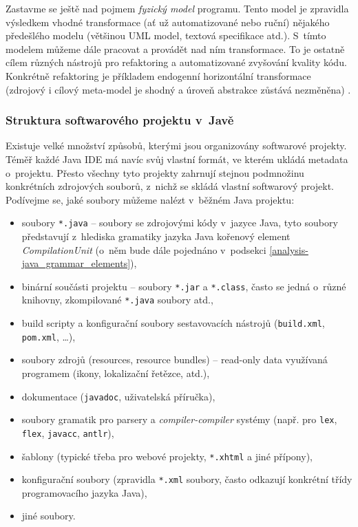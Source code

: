 Zastavme se ještě nad pojmem \emph{fyzický model} programu. Tento model je zpravidla výsledkem vhodné transformace (ať už automatizované nebo ruční) nějakého předešlého modelu (většinou UML model, textová specifikace atd.). S~tímto modelem můžeme dále pracovat a provádět nad ním transformace. To je ostatně cílem různých nástrojů pro refaktoring a automatizované zvyšování kvality kódu. Konkrétně refaktoring je příkladem endogenní horizontální transformace (zdrojový i cílový meta-model je shodný a úroveň abstrakce zůstává nezměněna) \cite{Mens05ataxonomy}.

\subsubsection{Struktura softwarového projektu v~Javě}
Existuje velké množství způsobů, kterými jsou organizovány softwarové projekty. Téměř každé Java IDE má navíc svůj vlastní formát, ve kterém ukládá metadata o~projektu. Přesto všechny tyto projekty zahrnují stejnou podmnožinu konkrétních zdrojových souborů, z~nichž se skládá vlastní softwarový projekt. Podívejme se, jaké soubory můžeme nalézt v~běžném Java projektu:

\begin{itemize}
\item soubory \verb+*.java+ -- soubory se zdrojovými kódy v~jazyce Java, tyto soubory představují z~hlediska gramatiky jazyka Java kořenový element \emph{CompilationUnit} (o~něm bude dále pojednáno v~podsekci \ref{analysis-java_grammar_elements}),
\item binární součásti projektu -- soubory \verb+*.jar+ a \verb+*.class+, často se jedná o~různé knihovny, zkompilované \verb+*.java+ soubory atd.,
\item build scripty a konfigurační soubory sestavovacích nástrojů (\verb+build.xml+, \verb+pom.xml+, \ldots),
\item soubory zdrojů (resources, resource bundles) -- read-only data využívaná programem (ikony, lokalizační řetězce, atd.),
\item dokumentace (\verb+javadoc+, uživatelská příručka),
\item soubory gramatik pro parsery a \emph{compiler-compiler} systémy (např. pro \verb+lex+, \verb+flex+, \verb+javacc+, \verb+antlr+),
\item šablony (typické třeba pro webové projekty, \verb+*.xhtml+ a jiné přípony),
\item konfigurační soubory (zpravidla \verb+*.xml+ soubory, často odkazují konkrétní třídy programovacího jazyka Java),
\item jiné soubory.
\end{itemize}


